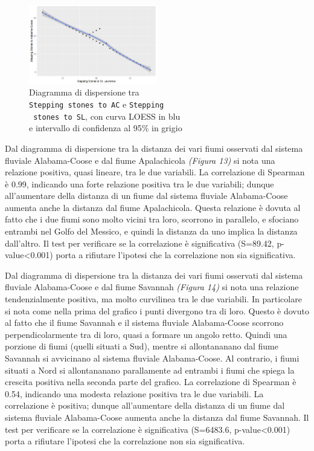 \documentclass{article} %
\begin{document}
\begin{figure}[H]
        \centering
        \includegraphics[width=0.5\textwidth]{immagini/ac_sl.png}
        \captionsetup{justification=centering}
        \caption{Diagramma di dispersione tra \\\texttt{Stepping stones to AC} e \texttt{Stepping}\\\texttt{ stones to SL}, con curva LOESS in blu \\e intervallo di confidenza al 95\% in grigio}
\end{figure}
Dal diagramma di dispersione tra la distanza dei vari fiumi osservati dal sistema fluviale Alabama-Coose e dal fiume Apalachicola \textit{(Figura 13)} si nota una relazione positiva, quasi lineare, tra le due variabili.  
La correlazione di Spearman è 0.99, indicando una forte relazione positiva tra le due variabili; dunque all'aumentare della distanza di un fiume dal sistema fluviale Alabama-Coose aumenta anche la distanza dal fiume Apalachicola. 
Questa relazione è dovuta al fatto che i due fiumi sono molto vicini tra loro, scorrono in parallelo, e sfociano entrambi nel Golfo del Messico, e quindi la distanza da uno implica la distanza dall'altro.
Il test per verificare se la correlazione è significativa (S=89.42, p-value<0.001) porta a rifiutare l'ipotesi che la correlazione non sia significativa.


Dal diagramma di dispersione tra la distanza dei vari fiumi osservati dal sistema fluviale Alabama-Coose e dal fiume Savannah \textit{(Figura 14)} si nota una relazione tendenzialmente positiva, ma molto curvilinea tra le due variabili. 
In particolare si nota come nella prima del grafico i punti divergono tra di loro. Questo è dovuto al fatto che il fiume Savannah e il sistema fluviale Alabama-Coose scorrono perpendicolarmente tra di loro, quasi a formare un angolo retto. Quindi una porzione di fiumi (quelli situati a Sud), mentre si allontananano dal fiume Savannah si avvicinano al sistema fluviale Alabama-Coose. Al contrario, i fiumi situati a Nord si allontananano parallamente ad entrambi i fiumi che spiega la crescita positiva nella seconda parte del grafico.
La correlazione di Spearman è 0.54, indicando una modesta relazione positiva tra le due variabili. La correlazione è positiva; dunque all'aumentare della distanza di un fiume dal sistema fluviale Alabama-Coose aumenta anche la distanza dal fiume Savannah. 
Il test per verificare se la correlazione è significativa (S=6483.6, p-value<0.001) porta a rifiutare l'ipotesi che la correlazione non sia significativa.
\end{document}
